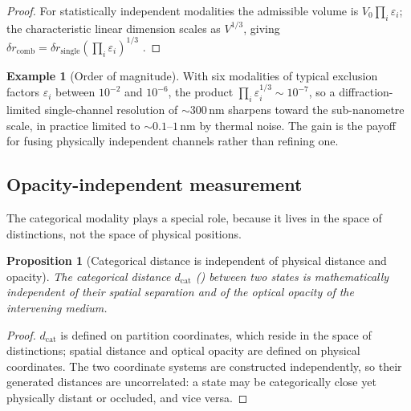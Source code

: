 \documentclass[11pt,twocolumn,a4paper]{article}
\theoremstyle{thmstyle}
\newtheorem{proposition}[theorem]{Proposition}
\theoremstyle{definition}
\newtheorem{example}[theorem]{Example}
\theoremstyle{remark}
\newcommand{\dcat}{d_{\mathrm{cat}}}
\newcommand{\eps}{\varepsilon}
\begin{document}
\begin{proof}
For statistically independent modalities the admissible volume is
$V_0\prod_i\eps_i$; the characteristic linear dimension scales as
$V^{1/3}$, giving $\delta r_{\mathrm{comb}}=\delta
r_{\mathrm{single}}(\prod_i\eps_i)^{1/3}$
\citep{fang2008simple}.
\end{proof}

\begin{example}[Order of magnitude]
\label{ex:resolution}
With six modalities of typical exclusion factors $\eps_i$ between
$10^{-2}$ and $10^{-6}$, the product $\prod_i\eps_i^{1/3}\sim10^{-7}$, so a
diffraction-limited single-channel resolution of $\sim300\,\mathrm{nm}$
sharpens toward the sub-nanometre scale, in practice limited to
$\sim0.1$--$1\,\mathrm{nm}$ by thermal noise. The gain is the payoff for
fusing physically independent channels rather than refining one.
\end{example}

\subsection{Opacity-independent measurement}

The categorical modality plays a special role, because it lives in the
space of distinctions, not the space of physical positions.

\begin{proposition}[Categorical distance is independent of physical
distance and opacity]
\label{prop:opacity}
The categorical distance $\dcat$ () between two states is
mathematically independent of their spatial separation and of the optical
opacity of the intervening medium.
\end{proposition}

\begin{proof}
$\dcat$ is defined on partition coordinates, which reside in the space of
distinctions; spatial distance and optical opacity are defined on physical
coordinates. The two coordinate systems are constructed independently, so
their generated distances are uncorrelated: a state may be categorically
close yet physically distant or occluded, and vice versa.
\end{proof}
\end{document}
